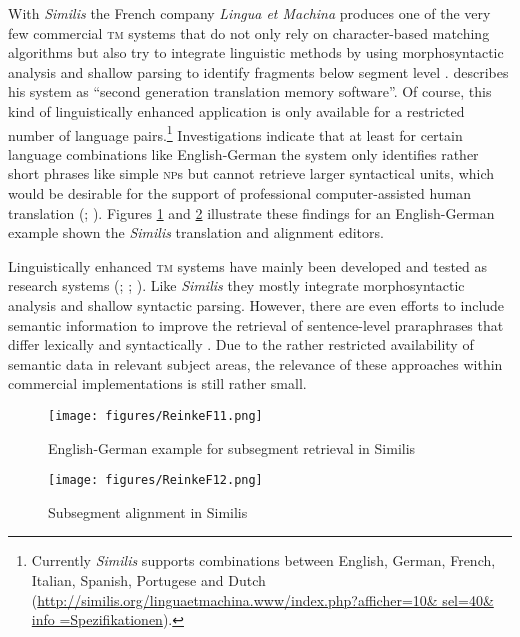 \documentclass[output=paper]{LSP/langsci}
\begin{document}
With \textit{Similis} the French company \textit{Lingua et Machina} produces one of the very few commercial \textsc{tm} systems that do not only rely on character-based matching algorithms but also try to integrate linguistic methods by using morphosyntactic analysis and shallow parsing to identify fragments below segment level \citep{Planas2005}. \citet{Planas2005} describes his system as ``second generation translation memory software''. Of course, this kind of linguistically enhanced application is only available for a restricted number of language pairs.\footnote{Currently \textit{Similis} supports combinations between English, German, French, Italian, Spanish, Portugese and Dutch (\url{http://similis.org/linguaetmachina.www/index.php?afficher=10\& sel=40\& info =Spezifikationen}).} Investigations indicate that at least for certain language combinations like English-German the system only identifies rather short phrases like simple \textsc{np}s but cannot retrieve larger syntactical units, which would be desirable for the support of professional computer-assisted human translation (\citealt{Kriele2006}; \citealt{Macken2009}). Figures \ref{fig:reinke:11} and \ref{fig:reinke:12} illustrate these findings for an English-German example shown the \textit{Similis} translation and alignment editors.
 
Linguistically enhanced \textsc{tm} systems have mainly been developed and tested as research systems (\citealt{GottiEtAl2005}; \citealt{Hodász2005}; \citealt{Mitkov2008}). Like \textit{Similis} they mostly integrate morphosyntactic analysis and shallow syntactic parsing. However, there are even efforts to include semantic information to improve the retrieval of sentence-level praraphrases that differ lexically and syntactically \citep{Mitkov2008}. Due to the rather restricted availability of semantic data in relevant subject areas, the relevance of these approaches within commercial implementations is still rather small.
 

\begin{figure}
\caption{English-German example for subsegment retrieval in Similis\label{fig:reinke:11}}
\texttt{[image: figures/ReinkeF11.png]} 
\end{figure}

\begin{figure}
\caption{Subsegment alignment in Similis\label{fig:reinke:12}}
\texttt{[image: figures/ReinkeF12.png]} 
\end{figure}
\end{document}
